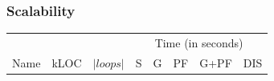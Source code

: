 \documentclass{beamer}
\begin{document}
\begin{frame}
\begin{figure}[h]
  \begin{center}
    
  \end{center} 
  \end{figure}
\end{frame}

\begin{frame}
	\frametitle{Scalability}

\begin{table}[!h]
	\centering
\begin{tabular}{|l|r|r||r|r|r|r|r|} \hline
	 	 & & &
        \multicolumn{5}{|c|}{Time (in seconds)} 
		\\ \cline{4-8}
		Name & kLOC & $ |loops| $ & S & G & PF & G+PF & DIS \\ \hline
		
	\hline
\end{tabular}
\label{fig:projects}
\end{table}
 
\end{frame}
\end{document}
